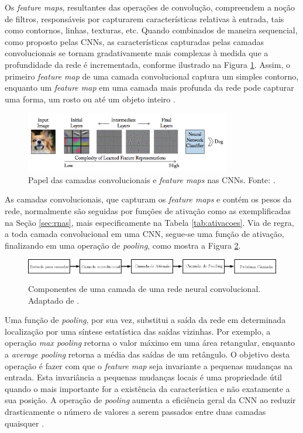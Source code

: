 Os \emph{feature maps}, resultantes das operações de convolução, compreendem a noção de filtros, responsáveis por capturarem características relativas à entrada, tais como contornos, linhas, texturas, etc. Quando combinados de maneira sequencial, como proposto pelas CNNs, as características capturadas pelas camadas convolucionais se tornam gradativamente mais complexas à medida que a profundidade da rede é incrementada, conforme ilustrado na Figura \ref{fig:convolutions}. Assim, o primeiro \emph{feature map} de uma camada convolucional captura um simples contorno, enquanto um \emph{feature map} em uma camada mais profunda da rede pode capturar uma forma, um rosto ou até um objeto inteiro \cite{Buduma:Livro}.

\begin{figure}[!ht]
	\centering
	\caption{Papel das camadas convolucionais e \emph{feature maps} nas CNNs. Fonte: \cite{Khan:Livro}.}
	\label{fig:convolutions}
	\includegraphics[width=0.8\textwidth]{./img/fundamenta/convolutions}
\end{figure}

As camadas convolucionais, que capturam os \emph{feature maps} e contém os pesos da rede, normalmente são seguidas por funções de ativação como as exemplificadas na Seção \ref{sec:rnas}, mais especificamente na Tabela \ref{tab:ativacoes}. Via de regra, a toda camada convolucional em uma CNN, segue-se uma função de ativação, finalizando em uma operação de \emph{pooling}, como mostra a Figura \ref{fig:cnn_camada}.

\begin{figure}[!ht]
	\centering
	\caption{Componentes de uma camada de uma rede neural convolucional. Adaptado de \cite{goodfellow2016deep}.}
	\label{fig:cnn_camada}
	\includegraphics[width=\textwidth]{img/cnn_camada_ipe.png}
\end{figure}

 Uma função de \emph{pooling}, por sua vez, substitui a saída da rede em determinada localização por uma síntese estatística das saídas vizinhas. Por exemplo, a operação \emph{max pooling} retorna o valor máximo em uma área retangular, enquanto a \emph{average pooling} retorna a média das saídas de um retângulo. O objetivo desta operação é fazer com que o \emph{feature map} seja invariante a pequenas mudanças na entrada. Esta invariância a pequenas mudanças locais é uma propriedade útil quando o mais importante for a existência da característica e não exatamente a sua posição. A operação de \emph{pooling} aumenta a eficiência geral da CNN ao reduzir drasticamente o número de valores a serem passados entre duas camadas quaisquer \cite{goodfellow2016deep}.

